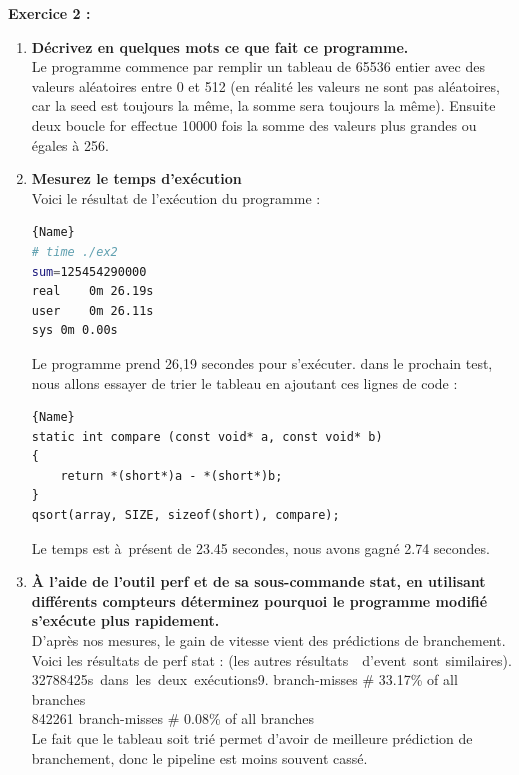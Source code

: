 \documentclass[
	a4paper, %
	10pt, %
]{CSUniSchoolLabReport}
\begin{document}
\textbf{Exercice 2 :}
\begin{enumerate}[label=\textbf{\arabic*}]

\item \textbf{Décrivez en quelques mots ce que fait ce programme.}\\
Le programme commence par remplir un tableau de 65536 entier avec des valeurs aléatoires entre 0 et 512 (en réalité les valeurs ne sont pas aléatoires, car la seed est toujours la m\^eme, la somme sera toujours la m\^eme).
Ensuite deux boucle for effectue 10000 fois la somme des valeurs plus grandes ou \'egales à 256.

\item \textbf{Mesurez le temps d’exécution}\\
Voici le r\'esultat de l'ex\'ecution du programme :


\begin{lstlisting}[language=bash, firstnumber=1]{Name}
# time ./ex2 
sum=125454290000
real	0m 26.19s
user	0m 26.11s
sys	0m 0.00s
\end{lstlisting}

Le programme prend 26,19 secondes pour s'ex\'ecuter.
dans le prochain test, nous allons essayer de trier le tableau en ajoutant ces lignes de code :
\begin{lstlisting}[style=CStyle, caption=Code modifié, firstnumber=1]{Name}
static int compare (const void* a, const void* b)
{
    return *(short*)a - *(short*)b;
}
qsort(array, SIZE, sizeof(short), compare);
\end{lstlisting}

Le temps est \`a\ pr\'esent de 23.45 secondes, nous avons gagn\'e 2.74 secondes.

\item \textbf{À l’aide de l’outil perf et de sa sous-commande stat, en utilisant différents compteurs déterminez pourquoi le programme modifié s’exécute plus rapidement.}\\

D'apr\`es nos mesures, le gain de vitesse vient des pr\'edictions de branchement.
Voici les r\'esultats de perf stat : (les autres r\'esultats\ \ d'event\ sont\ similaires).\\
32788425s\ dans\ les\ deux\ ex\'ecutions9.      branch-misses             \#   33.17\% of all branches\\
842261         branch-misses             \#    0.08\% of all branches\\

Le fait que le tableau soit trié permet d'avoir de meilleure pr\'ediction de branchement, donc le pipeline est moins souvent cassé.
\end{enumerate}
\end{document}
